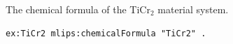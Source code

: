The chemical formula of the TiCr$_2$ material system.
\begin{lstlisting}[language=turtle]
ex:TiCr2 mlips:chemicalFormula "TiCr2" .
\end{lstlisting}

